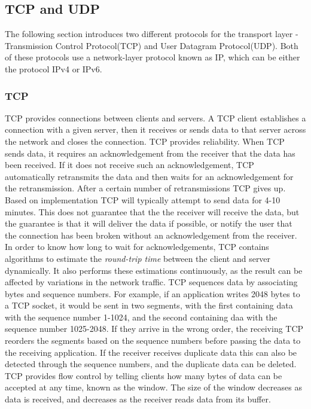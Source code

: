 \subsection{TCP and UDP}
The following section introduces two different protocols for the transport layer - Transmission Control Protocol(TCP) and User Datagram Protocol(UDP).
Both of these protocols use a network-layer protocol known as IP, which can be either the protocol IPv4 or IPv6.

\subsubsection{TCP}
TCP provides connections between clients and servers.
A TCP client establishes a connection with a given server, then it receives or sends data to that server across the network and closes the connection.
TCP provides reliability.
When TCP sends data, it requires an acknowledgement from the receiver that the data has been received.
If it does not receive such an acknowledgement, TCP automatically retransmits the data and then waits for an acknowledgement for the retransmission.
After a certain number of retransmissions TCP gives up.
Based on implementation TCP will typically attempt to send data for 4-10 minutes.
This does not guarantee that the the receiver will receive the data, but the guarantee is that it will deliver the data if possible, or notify the user that the connection has been broken without an acknowledgement from the receiver.
In order to know how long to wait for acknowledgements, TCP contains algorithms to estimate the \textit{round-trip time} between the client and server dynamically.
It also performs these estimations continuously, as the result can be affected by variations in the network traffic.
TCP sequences data by associating bytes and sequence numbers.
For example, if an application writes 2048 bytes to a TCP socket, it would be sent in two segments, with the first containing data with the sequence number 1-1024, and the second containing daa with the sequence number 1025-2048.
If they arrive in the wrong order, the receiving TCP reorders the segments based on the sequence numbers before passing the data to the receiving application.
If the receiver receives duplicate data this can also be detected through the sequence numbers, and the duplicate data can be deleted.
TCP provides flow control by telling clients how many bytes of data can be accepted at any time, known as the window.
The size of the window decreases as data is received, and decreases as the receiver reads data from its buffer.


